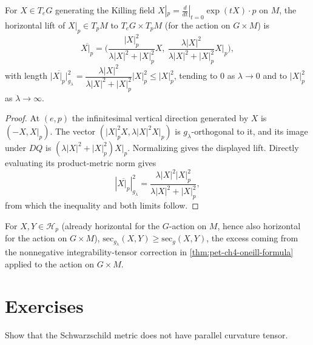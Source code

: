 \begin{proposition}
  \label{prop:pet-ch4-berger-cheeger-horizontal-lift}

  For $X\in T_eG$ generating the Killing field $X|_p=\tfrac d{dt}|_{t=0}\exp(tX)\cdot p$
  on $M$, the horizontal lift of $X|_p\in T_pM$ to $T_eG\times T_pM$ (for the
  action on $G\times M$) is
  \[
    \overline{X|_p}=\Big(\frac{|X|_p^2}{\lambda|X|^2+|X|_p^2}X,\ \frac{\lambda|X|^2}{\lambda|X|^2+|X|_p^2}X|_p\Big),
  \]
  with length $\big|\overline{X|_p}\big|_{g_\lambda}^2=\dfrac{\lambda|X|^2}{\lambda|X|^2+|X|_p^2}|X|_p^2\le|X|_p^2$,
  tending to $0$ as $\lambda\to0$ and to $|X|_p^2$ as $\lambda\to\infty$.
\end{proposition}
\begin{proof}
  \sketch
  At $(e,p)$ the infinitesimal vertical direction generated by $X$ is
  $(-X,X|_p)$. The vector
  $(|X|_p^2X,\lambda|X|^2X|_p)$ is $g_\lambda$-orthogonal to it, and
  its image under $DQ$ is
  $(\lambda|X|^2+|X|_p^2)X|_p$. Normalizing gives the displayed lift. Directly
  evaluating its product-metric norm gives
  \[
    |\overline{X|_p}|_{g_\lambda}^2
    =\frac{\lambda|X|^2|X|_p^2}{\lambda|X|^2+|X|_p^2},
  \]
  from which the inequality and both limits follow.
\end{proof}


\begin{remark}
  \label{rem:pet-ch4-berger-cheeger-curvature-increase}

  For $X,Y\in\mathcal H_p$ (already horizontal for the $G$-action on $M$, hence
  also horizontal for the action on $G\times M$),
  $\mathrm{sec}_{g_\lambda}(X,Y)\ge\mathrm{sec}_g(X,Y)$, the excess coming from
  the nonnegative integrability-tensor correction in
  \cref{thm:pet-ch4-oneill-formula} applied to the action on $G\times M$.
\end{remark}

\section{Exercises}

\begin{remark}
  \label{rem:pet-ch4-ex-1}

  Show that the Schwarzschild metric does not have parallel curvature tensor.
\end{remark}

